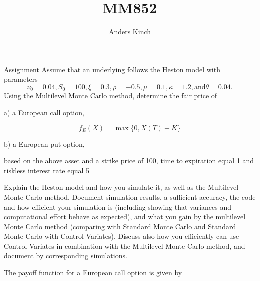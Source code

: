 \documentclass[12pt, twoside,a4paper]{article}
\title{MM852}
\author{Anders Kinch}
\date {}
\begin{document}
\maketitle


Assignment
Assume that an underlying follows the Heston model with parameters $$\nu_0=0.04, S_0=100, \xi=0.3, \rho=-0.5, \mu=0.1,
\kappa = 1.2, \text{and} \theta=0.04. $$ Using the Multilevel Monte Carlo method, determine the fair price of



a) a European call option,

\begin{equation}
  f_E (X) = \max \{0, X(T)-K\}
\end{equation}


b) a European put option,

based on the above asset and a strike price of 100, time to expiration equal 1 and riskless interest rate equal 5%

Explain the Heston model and how you simulate it, as well as the Multilevel Monte Carlo method. Document simulation results,  a sufficient accuracy, the code and how efficient your simulation is (including showing that variances and computational effort behave as expected), and what you gain by the multilevel Monte Carlo method (comparing with Standard Monte Carlo and Standard Monte Carlo with Control Variates). Discuss also how you efficiently can use Control Variates in combination with the Multilevel Monte Carlo method, and document by corresponding simulations.

The payoff function for a European call option is given by  


\medskip

\nocite{*}

%

\end{document}
